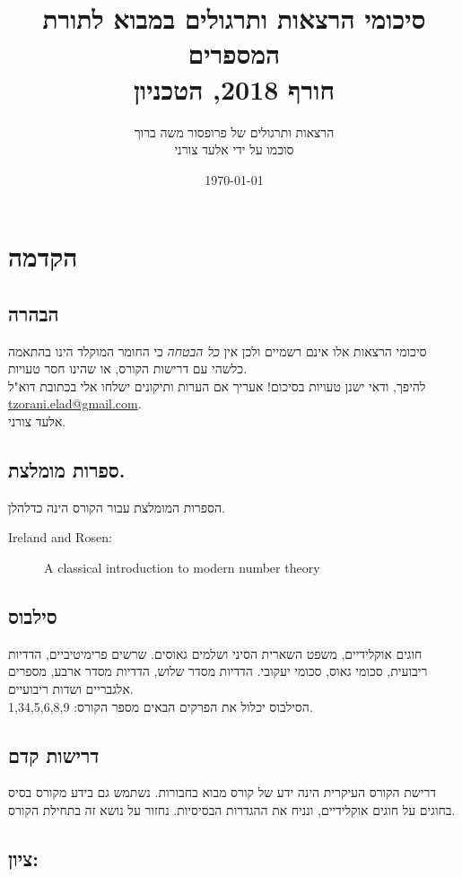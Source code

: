 \documentclass[a4paper,10pt,twoside,openany]{book}
\title{סיכומי הרצאות ותרגולים במבוא לתורת המספרים \\ \large{חורף 2018, הטכניון}}
\author{הרצאות ותרגולים של פרופסור משה ברוך \\ \large סוכמו על ידי אלעד צורני}
\date{\today}
\begin{document}
\frontmatter
{}
\tableofcontents
\countlectures
\counttutorials
\newpage

\chapter*{הקדמה}

\section*{הבהרה}

סיכומי הרצאות אלו אינם רשמיים ולכן אין
\emph{כל הבטחה}
כי החומר המוקלד הינו בהתאמה כלשהי עם דרישות הקורס, או שהינו חסר טעויות.
\\
להיפך, ודאי ישנן טעויות בסיכום! אעריך אם הערות ותיקונים ישלחו אלי בכתובת דוא"ל
\textenglish{\href{mailto:tzorani.elad@gmail.com}{tzorani.elad@gmail.com}}.\\
אלעד צורני.

\section*{ספרות מומלצת.}

הספרות המומלצת עבור הקורס הינה כדלהלן.

\begin{english}
\begin{description}
\item[Ireland and Rosen:] A classical introduction to modern number theory
\end{description}
\end{english}

\section*{סילבוס}
חוגים אוקלידיים, משפט השארית הסיני ושלמים גאוסים. שרשים פרימיטיביים, הדדיות ריבועית, סכומי גאוס, סכומי יעקובי. הדדיות מסדר שלוש, הדדיות מסדר ארבע, מספרים אלגבריים ושדות ריבועיים.\\
הסילבוס יכלול את הפרקים הבאים מספר הקורס: 1,34,5,6,8,9.

\section*{דרישות קדם}
דרישת הקורס העיקרית הינה ידע של קורס מבוא בחבורות. נשתמש גם בידע מקורס בסיס בחוגים על חוגים אוקלידיים, ונניח את ההגדרות הבסיסיות. נחזור על נושא זה בתחילת הקורס.

\section*{ציון:}
\end{document}
